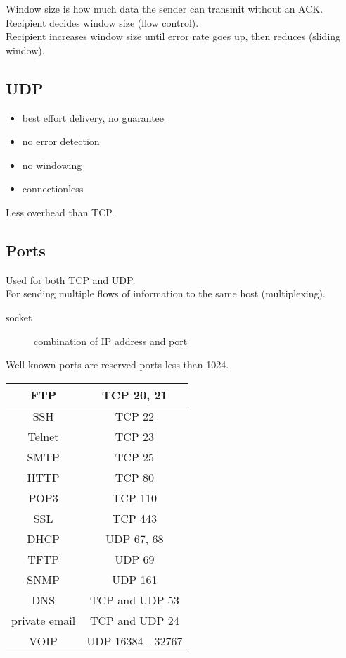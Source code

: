 Window size is how much data the sender can transmit without an ACK.\\

Recipient decides window size (flow control).\\

Recipient increases window size until error rate goes up, then reduces (sliding
window).

\subsection{UDP}

\begin{itemize}

\item best effort delivery, no guarantee
\item no error detection
\item no windowing
\item connectionless

\end{itemize}

Less overhead than TCP.

\subsection{Ports}

Used for both TCP and UDP.\\

For sending multiple flows of information to the same host (multiplexing).

\begin{description}

\item[socket]
combination of IP address and port

\end{description}

Well known ports are reserved ports less than 1024.\\

\begin{tabular}{ | c | c | }
\hline
FTP & TCP 20, 21 \\ \hline
SSH & TCP 22 \\ \hline
Telnet & TCP 23 \\ \hline
SMTP & TCP 25 \\ \hline
HTTP & TCP 80 \\ \hline
POP3 & TCP 110 \\ \hline
SSL & TCP 443 \\ \hline
\hline
DHCP & UDP 67, 68 \\ \hline
TFTP & UDP 69 \\ \hline
SNMP & UDP 161 \\ \hline
\hline
DNS & TCP and UDP 53 \\ \hline
private email & TCP and UDP 24 \\ \hline
\hline
VOIP & UDP 16384 - 32767 \\ \hline
\end{tabular}
